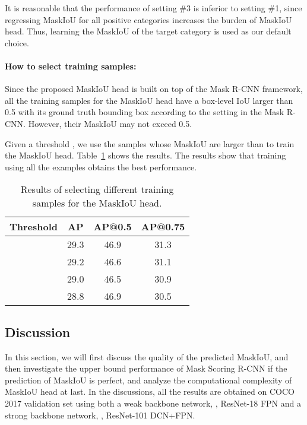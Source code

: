 \documentclass[10pt,twocolumn,letterpaper]{article}
\begin{document}
    It is reasonable that the performance of setting \#3 is inferior to setting \#1, since regressing MaskIoU for all positive categories increases the burden of MaskIoU head.
    Thus, learning the MaskIoU of the target category is used as our default choice.


  
    
\paragraph{How to select training samples:}

    Since the proposed MaskIoU head is built on top of the Mask R-CNN framework, all the training samples for the MaskIoU head have a box-level IoU larger than 0.5 with its ground truth bounding box according to the setting in the Mask R-CNN. However, their MaskIoU may not exceed 0.5. 
    
    Given a threshold , we use the samples whose MaskIoU are larger than  to train the MaskIoU head. Table~\ref{table:trainingsamples} shows the results. The results show that training using all the examples obtains the best performance.
    
    
\begin{table}
\caption{Results of selecting different training samples for the MaskIoU head.}
\vspace{3mm}
  \centering
\setlength{\tabcolsep}{3mm}
  {\begin{tabular}{c|c c c}
  \toprule
    Threshold & AP & AP@0.5 & AP@0.75 \\
    \midrule
     & 29.3 & 46.9 & 31.3 \\
      & 29.2 & 46.6 & 31.1 \\
      & 29.0 & 46.5 & 30.9 \\
      & 28.8 & 46.9 & 30.5 \\
    \bottomrule
  \end{tabular}}
  \label{table:trainingsamples}
\end{table}      
    

\subsection{Discussion}

    In this section, we will first discuss the quality of the predicted MaskIoU, and then investigate the upper bound performance of Mask Scoring R-CNN if the prediction of MaskIoU is perfect, and analyze the computational complexity of MaskIoU head at last.
    In the discussions, all the results are obtained on COCO 2017 validation set using both a weak backbone network, \ie, ResNet-18 FPN and a strong backbone network, \ie, ResNet-101 DCN+FPN.
    
\end{document}
